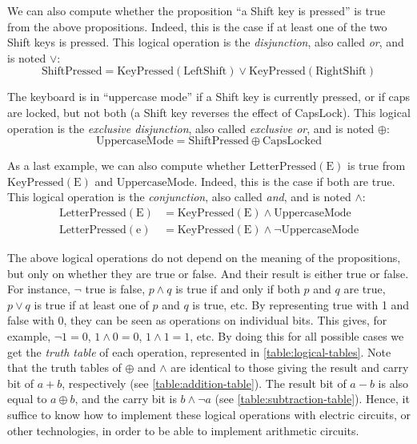 We can also compute whether the proposition ``a Shift key is pressed'' is true
from the above propositions. Indeed, this is the case if at least one of the
two Shift keys is pressed. This logical operation is the {\em disjunction},
also called {\em or}, and is noted $\vee$:
\begin{equation*}
  \mathrm{ShiftPressed} = \mathrm{KeyPressed}(\mathrm{LeftShift}) \vee
    \mathrm{KeyPressed}(\mathrm{RightShift})
\end{equation*}

The keyboard is in ``uppercase mode'' if a Shift key is currently pressed, or
if caps are locked, but not both (a Shift key reverses the effect of
CapsLock). This logical operation is the {\em exclusive disjunction},
also called {\em exclusive or}, and is noted $\oplus$:
\begin{equation*}
  \mathrm{UppercaseMode} = \mathrm{ShiftPressed} \oplus \mathrm{CapsLocked}
\end{equation*}

As a last example, we can also compute whether
$\mathrm{LetterPressed}(\mathrm{E})$ is true from
$\mathrm{KeyPressed}(\mathrm{E})$ and $\mathrm{UppercaseMode}$. Indeed, this is
the case if both are true. This logical operation is the {\em conjunction},
also called {\em and}, and is noted $\wedge$:
\begin{align*}
  \mathrm{LetterPressed}(\mathrm{E}) &=
    \mathrm{KeyPressed}(\mathrm{E}) \wedge \mathrm{UppercaseMode} \\
  \mathrm{LetterPressed}(\mathrm{e}) &=
    \mathrm{KeyPressed}(\mathrm{E}) \wedge \neg \mathrm{UppercaseMode}
\end{align*}

The above logical operations do not depend on the meaning of the propositions,
but only on whether they are true or false. And their result is either true or
false. For instance, $\neg$ true is false, $p \wedge q$ is true if and only if
both $p$ and $q$ are true, $p \vee q$ is true if at least one of $p$ and $q$ is
true, etc. By representing true with 1 and false with 0, they can be seen as
operations on individual bits. This gives, for example, $\neg 1 = 0$, $1 \wedge
0 = 0$, $1 \wedge 1 = 1$, etc. By doing this for all possible cases we get the
{\em truth table} of each operation, represented in
\cref{table:logical-tables}. Note that the truth tables of $\oplus$ and
$\wedge$ are identical to those giving the result and carry bit of $a+b$,
respectively (see \cref{table:addition-table}). The result bit of $a-b$ is also
equal to $a \oplus b$, and the carry bit is $b \wedge \neg a$ (see
\cref{table:subtraction-table}). Hence, it suffice to know how to implement
these logical operations with electric circuits, or other technologies, in
order to be able to implement arithmetic circuits.

